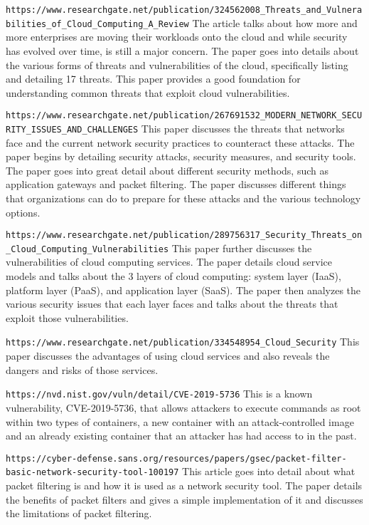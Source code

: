 \verb|https://www.researchgate.net/publication/324562008_Threats_and_Vulnerabilities_of_Cloud_Computing_A_Review|
The article talks about how more and more enterprises are moving their workloads onto the cloud and while
security has evolved over time, is still a major concern. The paper goes into details about the various forms
of threats and vulnerabilities of the cloud, specifically listing and detailing 17 threats. This paper
provides a good foundation for understanding common threats that exploit cloud vulnerabilities.

\verb|https://www.researchgate.net/publication/267691532_MODERN_NETWORK_SECURITY_ISSUES_AND_CHALLENGES|
This paper discusses the threats that networks face and the current network security practices to counteract these attacks.
The paper begins by detailing security attacks, security measures, and security tools. The paper goes into great detail about
different security methods, such as application gateways and packet filtering. The paper discusses different things that organizations
can do to prepare for these attacks and the various technology options.

\verb|https://www.researchgate.net/publication/289756317_Security_Threats_on_Cloud_Computing_Vulnerabilities|
This paper further discusses the vulnerabilities of cloud computing services. The paper details cloud service models and talks about
the 3 layers of cloud computing: system layer (IaaS), platform layer (PaaS), and application layer (SaaS). The paper then analyzes
the various security issues that each layer faces and talks about the threats that exploit those vulnerabilities.

\verb|https://www.researchgate.net/publication/334548954_Cloud_Security|
This paper discusses the advantages of using cloud services and also reveals the dangers and risks of those services.

\verb|https://nvd.nist.gov/vuln/detail/CVE-2019-5736|
This is a known vulnerability, CVE-2019-5736, that allows attackers to execute commands as root within two types of containers,
a new container with an attack-controlled image and an already existing container that an attacker has had access to in the past.

\verb|https://cyber-defense.sans.org/resources/papers/gsec/packet-filter-basic-network-security-tool-100197|
This article goes into detail about what packet filtering is and how it is used as a network security tool.
The paper details the benefits of packet filters and gives a simple implementation of it and discusses
the limitations of packet filtering.
